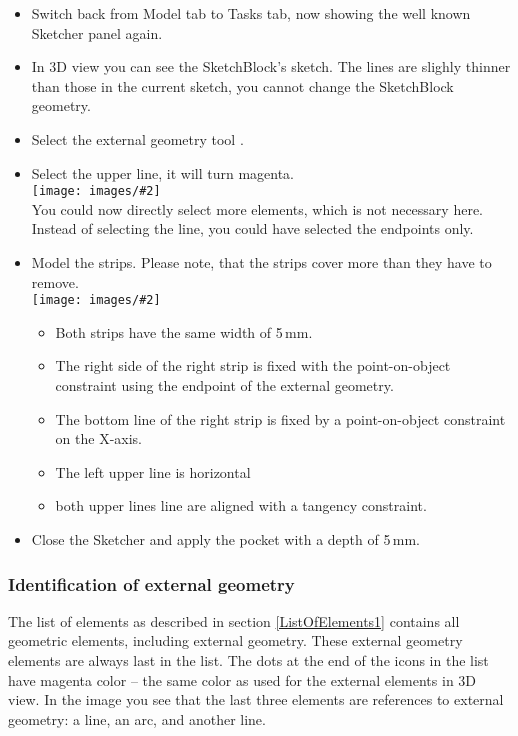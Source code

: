 \documentclass[12pt,titlepage]{article}
\newcommand{\icon}[1]{\raisebox{-1em}{\rule{0pt}{27pt}\texttt{[image: images/\#1]}}}
\newcommand{\img}[2]{\vspace{2ex}\noindent\texttt{[image: images/\#2]}}
\begin{document}
\begin {itemize}
\begin{itemize}
      The sketch named "SketchBlock" in the above picture is used to create
       the Pad named "PadBlock". The sketch we actually are still editing is
       Sketch009. In your model it will probably be named Sketch001.
\item Switch back from Model tab to Tasks tab, now showing the well known Sketcher panel
      again.
\item In 3D view you can see the SketchBlock's sketch. The lines are slighly
      thinner than those in the current sketch, you cannot change the
      SketchBlock geometry.
\item Select the external geometry tool \icon{Sketcher_External}.
\item Select the upper line, it will turn magenta.\\[1ex]
      \img{scale=0.8}{ExternalSelect}\\
      You could now directly select more elements, which is not necessary here.
      Instead of selecting the line, you could have selected the endpoints only.
\item Model the strips. Please note, that the strips cover more than they have to
      remove.\\[1ex]
\img{scale=0.85}{ExternalFinalSketch}

      \begin{itemize}
      \item Both strips have the same width of 5\,mm.
      \item The right side of the right strip is fixed with the point-on-object constraint
            using the endpoint of the external geometry.
      \item The bottom line of the right strip is fixed by a point-on-object constraint
            on the X-axis.
      \item The left upper line is horizontal
      \item both upper lines line are aligned with a tangency constraint.
      \end{itemize}
\item Close the Sketcher and apply the pocket with a depth of 5\,mm.
\end{itemize}

\subsubsection*{Identification of external geometry}
The list of elements as described in section \ref{ListOfElements1}  
contains all geometric elements, including external geometry. These external
geometry elements are always last in the list. The dots at the end of the
icons in the list have magenta color -- the same color as used for the
external elements in 3D view. In the image you see that the last three
elements are references to external geometry: a line, an arc, and another line.


\end{itemize}
\end{document}
